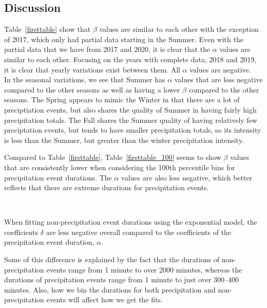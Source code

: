 \documentclass[11pt]{report}
\begin{document}
\clearpage

\subsection{Discussion}\label{sec:apcd}

Table~\ref{firsttable} show that $\beta$ values are similar to each other
with the exception of 2017, which only had partial data starting in the
Summer. Even with the partial data that we have from 2017 and 2020, it is
clear that the $\alpha$ values are similar to each other. Focusing on the
years with complete data, 2018 and 2019, it is clear that yearly variations
exist between them. All $\alpha$ values are negative.\\[-1.5em]





In the seasonal variations, we see that Summer has $\alpha$ values that are
less negative compared to the other seasons as well as having a lower
$\beta$ compared to the other seasons.  The Spring appears to mimic the
Winter in that there are a lot of preciptiation events, but also shares the
quality of Summer in having fairly high precipitation totals. The Fall
shares the Summer quality of having relatively few preciptation events, but
tends to have smaller precipitation totals, so its intensity is less than
the Summer, but greater than the winter precipitation intensity.

Compared to Table~\ref{firsttable}, Table~\ref{firsttable_100} seems to show
$\beta$ values that are consistently lower when considering the 100th
percentile bins for precipitation event durations. The $\alpha$ values are
also less negative, which better reflects that there are extreme durations
for precipitation events.

\ 





When fitting non-precipitation event durations using the exponential model,
the coefficients $\delta$ are less negative overall compared to the
coefficients of the precipitation event duration, $\alpha$.

Some of this difference is explained by the fact that the durations of
non-precipitation events range from 1 minute to over 2000 minutes, whereas
the durations of precipitation events range from 1 minute to just over
300--400 minutes. Also, how we bin the durations for both precipitation and
non-precipitation events will affect how we get the fits.
\end{document}
